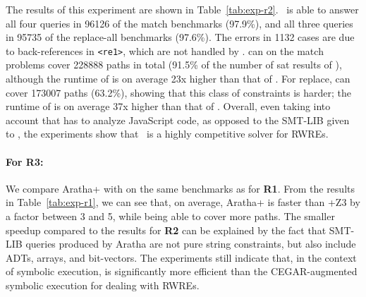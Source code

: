 The results of this experiment are shown in
Table~\ref{tab:exp-r2}. \ostrich\ is able to answer all four queries
in 96126 of the match benchmarks (97.9\%), and all three queries in
95735 of the replace-all benchmarks (97.6\%). The errors in 1132 cases
are due to back-references in \verb!<re1>!, which are not handled by
\ostrich. \expose{} can on the match problems cover 228888 paths in
total (91.5\% of the number of sat results of \ostrich), although the
runtime of \expose{} is on average 23x higher than that of
\ostrich. For replace, \expose{} can cover 173007 paths (63.2\%),
showing that this class of constraints is harder; the runtime of
\expose{} is on average 37x higher than that of \ostrich.  Overall,
even taking into account that \expose{} has to analyze JavaScript
code, as opposed to the SMT-LIB given to \ostrich, the experiments
show that \ostrich\ is a highly competitive solver for RWREs.

\paragraph{For \textbf{R3}:} We compare Aratha+{\ostrich} with \expose{}
on the same benchmarks as for \textbf{R1}.  From the results in
Table~\ref{tab:exp-r1}, we can see that, on average, Aratha+{\ostrich}
is faster than \expose{}+Z3 by a factor between 3 and 5, while being
able to cover more paths. The smaller speedup compared to the results
for \textbf{R2} can be explained by the fact that SMT-LIB queries
produced by Aratha are not pure string constraints, but also include
ADTs, arrays, and bit-vectors. The experiments still indicate that,
in the context of symbolic execution, {\ostrich} is significantly more
efficient than the CEGAR-augmented symbolic execution for dealing
with RWREs.
